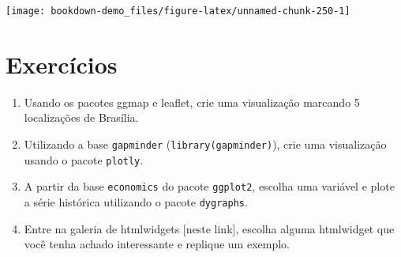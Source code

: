 \documentclass[]{book}
\newenvironment{Shaded}{\begin{snugshade}}{\end{snugshade}}
\newcommand{\KeywordTok}[1]{\textcolor[rgb]{0.13,0.29,0.53}{\textbf{#1}}}
\newcommand{\DataTypeTok}[1]{\textcolor[rgb]{0.13,0.29,0.53}{#1}}
\newcommand{\DecValTok}[1]{\textcolor[rgb]{0.00,0.00,0.81}{#1}}
\newcommand{\FloatTok}[1]{\textcolor[rgb]{0.00,0.00,0.81}{#1}}
\newcommand{\StringTok}[1]{\textcolor[rgb]{0.31,0.60,0.02}{#1}}
\newcommand{\OperatorTok}[1]{\textcolor[rgb]{0.81,0.36,0.00}{\textbf{#1}}}
\newcommand{\NormalTok}[1]{#1}
\begin{document}
\begin{Shaded}
\end{Shaded}

\begin{center}\texttt{[image: bookdown-demo\_files/figure-latex/unnamed-chunk-250-1]} \end{center}

\section{Exercícios}\label{exercicios-9}

\begin{enumerate}
\def\labelenumi{\arabic{enumi}.}
\item
  Usando os pacotes ggmap e leaflet, crie uma visualização marcando 5
  localizações de Brasília.
\item
  Utilizando a base \texttt{gapminder} (\texttt{library(gapminder)}),
  crie uma visualização usando o pacote \texttt{plotly}.
\item
  A partir da base \texttt{economics} do pacote \texttt{ggplot2},
  escolha uma variável e plote a série histórica utilizando o pacote
  \texttt{dygraphs}.
\item
  Entre na galeria de htmlwidgets {[}neste link{]}, escolha alguma
  htmlwidget que você tenha achado interessante e replique um exemplo.
\end{enumerate}
\end{document}
